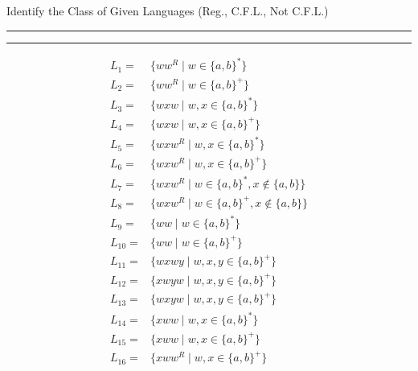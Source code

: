 \documentclass[12pt,fleqn]{article}
\begin{document}
\ttfamily
\thispagestyle{empty}

\centerline{\large Identify the Class of Given Languages (Reg., C.F.L., Not C.F.L.)}
\medskip\hrule\hrule 

\[\begin{array}{rl}
L_1 = &  \{ww^R \mid w \in \{a,b\}^*\}\\[.9cm]
L_2 = &  \{ww^R \mid w \in \{a,b\}^+\}\\[.9cm]
L_3 = &  \{wxw \mid w,x \in \{a,b\}^*\}\\[.9cm]
L_4 = &  \{wxw \mid w,x \in \{a,b\}^+\}\\[.9cm]
L_5 = &  \{wxw^R \mid w,x \in \{a,b\}^*\}\\[.9cm]
L_6 = &  \{wxw^R \mid w,x \in \{a,b\}^+\}\\[.9cm]
L_7 = &  \{wxw^R \mid w \in \{a,b\}^*, x\not\in \{a,b\}\}\\[.9cm]
L_8 = &  \{wxw^R \mid w \in \{a,b\}^+, x\not\in \{a,b\}\}\\[.9cm]
L_9 = &  \{ww \mid w \in \{a,b\}^*\}\\[.9cm]
L_{10} = &  \{ww \mid w \in \{a,b\}^+\}\\[.9cm]
L_{11} = &  \{wxwy \mid w,x,y \in \{a,b\}^+\}\\[.9cm]
L_{12} = &  \{xwyw \mid w,x,y \in \{a,b\}^+\}\\[.9cm]
L_{13} = &  \{wxyw \mid w,x,y \in \{a,b\}^+\}\\[.9cm]
L_{14} = &  \{xww \mid w,x \in \{a,b\}^*\}\\[.9cm]
L_{15} = &  \{xww \mid w,x \in \{a,b\}^+\}\\[.9cm]
L_{16} = &  \{xww^R \mid w,x \in \{a,b\}^+\}\\[.9cm]
\end{array}
\]
\end{document}
